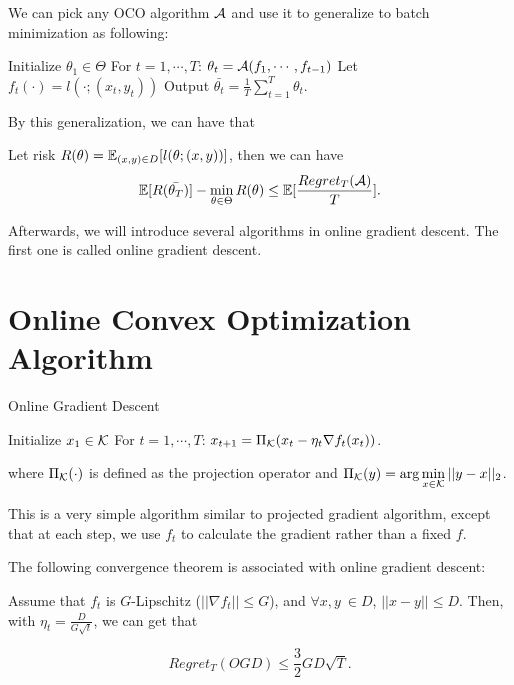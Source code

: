 \documentclass[../main.tex]{subfiles}
\begin{document}
We can pick any OCO algorithm $\mathcal{A}$ and use it to generalize to batch minimization as following:

\begin{algorithm}
	\begin{algorithmic}
		\STATE Initialize $\theta_1 \in \Theta$
		\STATE For $t = 1,\cdots ,T$:
		\bindent 
		\STATE $\theta_t = \mathcal{A}(f_1, \cdots, f_{t-1})$
		\STATE Let $f_t(\cdot) = l(\cdot; (x_t, y_t))$
		\eindent
		\STATE Output $ \bar{\theta_t} =  \frac{1}{T} \sum\limits_{t=1}^T \theta_t$.
	\end{algorithmic}
\end{algorithm}

By this generalization, we can have that

\begin{theorem}
	Let risk $R(\theta) = \mathbb{E}_{(x,y) \in D} [l(\theta;(x,y))]$, then we can have
	\begin{equation}
		\mathbb{E}[R(\bar{\theta_T})] - \min\limits_{\theta \in \Theta} R(\theta) \leq \mathbb{E}[\frac{Regret_T(\mathcal{A})}{T}].
	\end{equation}
\end{theorem}

Afterwards, we will introduce several algorithms in online gradient descent. The first one is called online gradient descent.

\section{Online Convex Optimization Algorithm}
\begin{algorithm}[H]
	\caption{Online Gradient Descent}
	\begin{algorithmic}
		\STATE Initialize $x_1 \in \mathcal{K}$
		\STATE For $t = 1,\cdots ,T$:
		\bindent 
		\STATE $x_{t+1} = \Pi_{\mathcal{K}} (x_t - \eta_t\nabla f_t(x_t))$.
		\eindent
	\end{algorithmic}
\end{algorithm}


where $\Pi_{\mathcal{K}}(\cdot)$ is defined as the projection operator and $\Pi_{\mathcal{K}}(y) = \arg\min\limits_{x\in \mathcal{K}} ||y-x||_2$.

This is a very simple algorithm similar to projected gradient algorithm, except that at each step, we use $f_t$ to calculate the gradient rather than a fixed $f$.

The following convergence theorem is associated with online gradient descent:

\begin{theorem}
	Assume that $f_t$ is $G$-Lipschitz ($||\nabla f_t||\leq G$), and $\forall x, y\ \in D$, $||x - y||\leq D$. Then, with $\eta_t = \frac{D}{G\sqrt{t}}$, we can get that 
	
	\begin{equation}
		Regret_T(OGD) \leq \frac{3}{2} GD\sqrt{T}.
	\end{equation}
\end{theorem}
\end{document}
